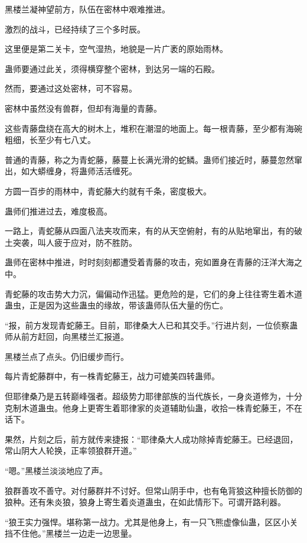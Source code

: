 
\begin{this_body}

黑楼兰凝神望前方，队伍在密林中艰难推进。

激烈的战斗，已经持续了三个多时辰。

这里便是第二关卡，空气湿热，地貌是一片广袤的原始雨林。

蛊师要通过此关，须得横穿整个密林，到达另一端的石殿。

然而，要通过这处密林，可不容易。

密林中虽然没有兽群，但却有海量的青藤。

这些青藤盘绕在高大的树木上，堆积在潮湿的地面上。每一根青藤，至少都有海碗粗细，长至少有七八丈。

普通的青藤，称之为青蛇藤，藤蔓上长满光滑的蛇鳞。蛊师们接近时，藤蔓忽然窜出，如大蟒缠身，将蛊师活活缠死。

方圆一百步的雨林中，青蛇藤大约就有千条，密度极大。

蛊师们推进过去，难度极高。

一路上，青蛇藤从四面八法夹攻而来，有的从天空俯射，有的从贴地窜出，有的破土突袭，叫人疲于应对，防不胜防。

蛊师在密林中推进，时时刻刻都遭受着青藤的攻击，宛如置身在青藤的汪洋大海之中。

青蛇藤的攻击势大力沉，偏偏动作迅猛。更危险的是，它们的身上往往寄生着木道蛊虫，正是因为这些蛊虫的缘故，带该蛊师队伍大量的伤亡。

“报，前方发现青蛇藤王。目前，耶律桑大人已和其交手。”行进片刻，一位侦察蛊师从前方赶回，向黑楼兰汇报道。

黑楼兰点了点头。仍旧缓步而行。

每片青蛇藤群中，有一株青蛇藤王，战力可媲美四转蛊师。

但耶律桑乃是五转巅峰强者。超级势力耶律部族的当代族长，一身炎道修为，十分克制木道蛊虫。他身上更寄生着耶律家的炎道辅助仙蛊，收拾一株青蛇藤王，不在话下。

果然，片刻之后，前方就传来捷报：“耶律桑大人成功除掉青蛇藤王。已经退回，常山阴大人轮换，正率领狼群开道。”

“嗯。”黑楼兰淡淡地应了声。

狼群善攻不善守。对付藤群并不讨好。但常山阴手中，也有龟背狼这种擅长防御的狼种。还有朱炎狼，狼身上寄生着炎道蛊虫，在如此情形下。可谓开路利器。

“狼王实力强悍。堪称第一战力。尤其是他身上，有一只飞熊虚像仙蛊，区区小关挡不住他。”黑楼兰一边走一边思量。


\end{this_body}
